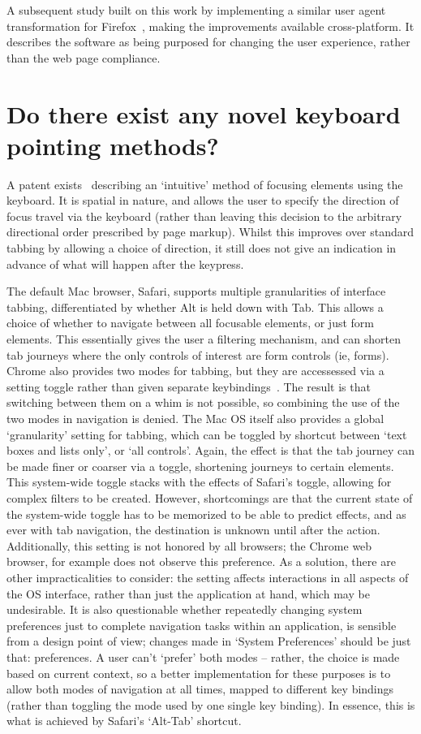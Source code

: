 \documentclass[a4paper, 12pt]{report}
\begin{document}
A subsequent study built on this work by implementing a similar user agent transformation for Firefox~\cite{hanson2005improving}, making the improvements available cross-platform. It describes the software as being purposed for changing the user experience, rather than the web page compliance.
\section{Do there exist any novel keyboard pointing methods?}
\label{novelpointing}
A patent exists~\cite{Mouyade:2011:EP2385452} describing an `intuitive' method of focusing elements using the keyboard. It is spatial in nature, and allows the user to specify the direction of focus travel via the keyboard (rather than leaving this decision to the arbitrary directional order prescribed by page markup). Whilst this improves over standard tabbing by allowing a choice of direction, it still does not give an indication in advance of what will happen after the keypress.

The default Mac browser, Safari, supports multiple granularities of interface tabbing, differentiated by whether Alt is held down with Tab\cite{safaria11y}. This allows a choice of whether to navigate between all focusable elements, or just form elements. This essentially gives the user a filtering mechanism, and can shorten tab journeys where the only controls of interest are form controls (ie, forms). Chrome also provides two modes for tabbing, but they are accessessed via a setting toggle rather than given separate keybindings~\cite{browserkeyboardaccess}. The result is that switching between them on a whim is not possible, so combining the use of the two modes in navigation is denied.
The Mac OS itself also provides a global `granularity' setting for tabbing, which can be toggled by shortcut between `text boxes and lists only', or `all controls'\cite{macshortcuts}. Again, the effect is that the tab journey can be made finer or coarser via a toggle, shortening journeys to certain elements. This system-wide toggle stacks with the effects of Safari's toggle, allowing for complex filters to be created. However, shortcomings are that the current state of the system-wide toggle has to be memorized to be able to predict effects, and as ever with tab navigation, the destination is unknown until after the action. Additionally, this setting is not honored by all browsers; the Chrome web browser, for example does not observe this preference\cite{browserkeyboardaccess}.
As a solution, there are other impracticalities to consider: the setting affects interactions in all aspects of the OS interface, rather than just the application at hand, which may be undesirable. It is also questionable whether repeatedly changing system preferences just to complete navigation tasks within an application, is sensible from a design point of view; changes made in `System Preferences' should be just that: preferences. A user can't `prefer' both modes -- rather, the choice is made based on current context, so a better implementation for these purposes is to allow both modes of navigation at all times, mapped to different key bindings (rather than toggling the mode used by one single key binding). In essence, this is what is achieved by Safari's `Alt-Tab' shortcut.
\end{document}
